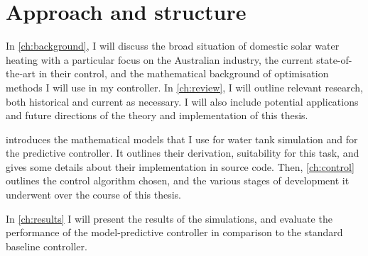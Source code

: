 \section{Approach and structure}

In \autoref{ch:background}, I will discuss the broad situation of domestic solar water heating with a particular focus on the Australian industry, the current state-of-the-art in their control, and the mathematical background of optimisation methods I will use in my controller.
In \autoref{ch:review}, I will outline relevant research, both historical and current as necessary.
I will also include potential applications and future directions of the theory and implementation of this thesis.

 introduces the mathematical models that I use for water tank simulation and for the predictive controller.
It outlines their derivation, suitability for this task, and gives some details about their implementation in source code.
Then, \autoref{ch:control} outlines the control algorithm chosen, and the various stages of development it underwent over the course of this thesis.

In \autoref{ch:results} I will present the results of the simulations, and evaluate the performance of the model-predictive controller in comparison to the standard baseline controller.
